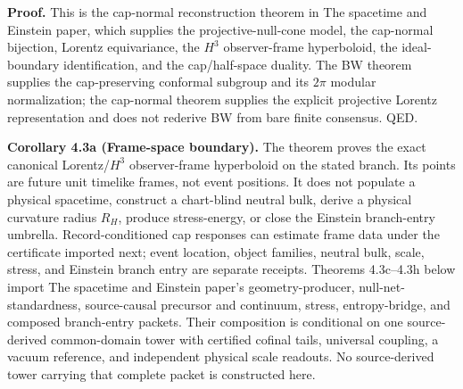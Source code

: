 \textbf{Proof.} This is the cap-normal reconstruction theorem in The spacetime and Einstein paper, which supplies the projective-null-cone model, the cap-normal bijection, Lorentz equivariance, the \(H^3\) observer-frame hyperboloid, the ideal-boundary identification, and the cap/half-space duality. The BW theorem supplies the cap-preserving conformal subgroup and its \(2\pi\) modular normalization; the cap-normal theorem supplies the explicit projective Lorentz representation and does not rederive BW from bare finite consensus. QED.

\textbf{Corollary 4.3a (Frame-space boundary).} The theorem proves the exact canonical Lorentz/\(H^3\) observer-frame hyperboloid on the stated branch. Its points are future unit timelike frames, not event positions. It does not populate a physical spacetime, construct a chart-blind neutral bulk, derive a physical curvature radius \(R_H\), produce stress-energy, or close the Einstein branch-entry umbrella. Record-conditioned cap responses can estimate frame data under the certificate imported next; event location, object families, neutral bulk, scale, stress, and Einstein branch entry are separate receipts. Theorems 4.3c--4.3h below import The spacetime and Einstein paper's geometry-producer, null-net-standardness, source-causal precursor and continuum, stress, entropy-bridge, and composed branch-entry packets. Their composition is conditional on one source-derived common-domain tower with certified cofinal tails, universal coupling, a vacuum reference, and independent physical scale readouts. No source-derived tower carrying that complete packet is constructed here.

